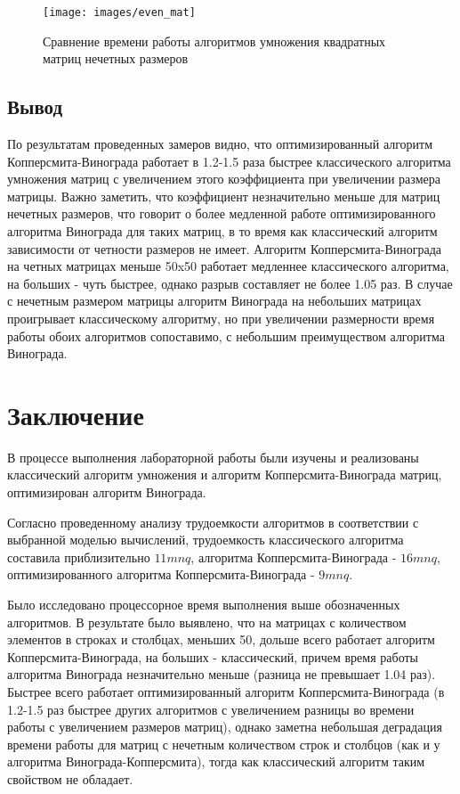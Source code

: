 \documentclass[12pt]{report}
\begin{document}
    \begin{figure}[H]
        \centering
        \texttt{[image: images/even\_mat]}
        \caption{Сравнение времени работы алгоритмов умножения квадратных матриц нечетных размеров}
        \label{fig:even_graph}
    \end{figure}


    \section{Вывод}

    По результатам проведенных замеров видно, что оптимизированный алгоритм Копперсмита-Винограда работает в 1.2-1.5 раза быстрее классического алгоритма умножения матриц с увеличением этого коэффициента при увеличении размера матрицы. Важно заметить, что коэффициент незначительно меньше для матриц нечетных размеров, что говорит о более медленной работе оптимизированного алгоритма Винограда для таких матриц, в то время как классический алгоритм зависимости от четности размеров не имеет. Алгоритм Копперсмита-Винограда на четных матрицах меньше 50x50 работает медленнее классического алгоритма, на больших - чуть быстрее, однако разрыв составляет не более 1.05 раз. В случае с нечетным размером матрицы алгоритм Винограда на небольших матрицах проигрывает классическому алгоритму, но при увеличении размерности время работы обоих алгоритмов сопоставимо, с небольшим преимуществом алгоритма Винограда.
    \newpage

    \chapter*{Заключение}
    В процессе выполнения лабораторной работы были изучены и реализованы классический алгоритм умножения и алгоритм Копперсмита-Винограда матриц, оптимизирован алгоритм Винограда.

    Согласно проведенному анализу трудоемкости алгоритмов в соответствии с выбранной моделью вычислений, трудоемкость классического алгоритма составила приблизительно $11mnq$, алгоритма Копперсмита-Винограда - $16mnq$, оптимизированного алгоритма Копперсмита-Винограда - $9mnq$.

    Было исследовано процессорное время выполнения выше обозначенных алгоритмов. В результате было выявлено, что на матрицах с количеством элементов в строках и столбцах, меньших 50, дольше всего работает алгоритм Копперсмита-Винограда, на больших - классический, причем время работы алгоритма Винограда незначительно меньше (разница не превышает 1.04 раз). Быстрее всего работает оптимизированный алгоритм Копперсмита-Винограда (в 1.2-1.5 раз быстрее других алгоритмов с увеличением разницы во времени работы с увеличением размеров матриц), однако заметна небольшая деградация времени работы для матриц с нечетным количеством строк и столбцов (как и у алгоритма Винограда-Копперсмита), тогда как классический алгоритм таким свойством не обладает.
\end{document}
